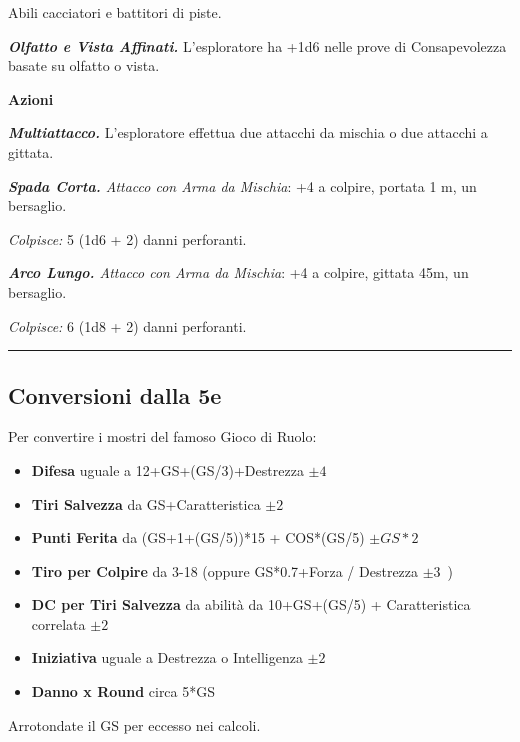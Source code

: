 \begin{multicols}{2}
{Abili cacciatori e battitori di piste.

\emph{\textbf{Olfatto e Vista Affinati.}} L'esploratore ha +1d6 nelle prove di Consapevolezza basate su olfatto o vista.

\textbf{Azioni}

\emph{\textbf{Multiattacco.}} L'esploratore effettua due attacchi da mischia o due attacchi a gittata.

\emph{\textbf{Spada Corta.} Attacco con Arma da Mischia}: +4 a colpire, portata 1 m, un bersaglio.

\emph{Colpisce:} 5 (1d6 + 2) danni perforanti.

\emph{\textbf{Arco Lungo.} Attacco con Arma da Mischia}: +4 a colpire, gittata 45m, un bersaglio.

\emph{Colpisce:} 6 (1d8 + 2) danni perforanti.

}  %


\rule{\linewidth}{2pt}

\subsection{Conversioni dalla 5e}

Per convertire i mostri del famoso Gioco di Ruolo:

\begin{itemize}[leftmargin=*] \setlength{\itemsep}{0pt}
\item \textbf{Difesa} uguale a 12+GS+(GS/3)+Destrezza $\pm4$\
\item \textbf{Tiri Salvezza} da GS+Caratteristica $\pm2$\
\item \textbf{Punti Ferita} da (GS+1+(GS/5))*15 + COS*(GS/5) $\pm GS*2$\
\item \textbf{Tiro per Colpire} da 3-18 (oppure GS*0.7+Forza / Destrezza $\pm3$\ )
\item \textbf{DC per Tiri Salvezza} da abilità da 10+GS+(GS/5) + Caratteristica correlata  $\pm2$\
\item \textbf{Iniziativa} uguale a Destrezza o Intelligenza  $\pm2$\
\item \textbf{Danno x Round} circa 5*GS
\end{itemize}

Arrotondate il GS per eccesso nei calcoli.

\end{multicols}

